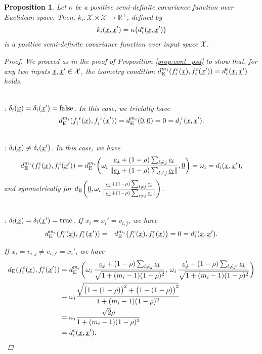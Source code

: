 \documentclass{article}
\newcommand{\vect}[1]{\underline{\smash{#1}}}
\renewcommand{\v}[1]{\vect{#1}}
\newcommand{\reals}{\mathds{R}}
\newcommand{\sX}{\mathcal{X}}
\newcommand{\br}{^{\text{\textnormal{ r}}}}
\newcommand{\cat}{^{\text{\textnormal{c}}}}
\newtheorem{prop}[thm]{Proposition}
\begin{document}
\begin{prop}
Let $\kappa$ be a positive semi-definite covariance function over Euclidean space.
Then, $k_i\colon \sX \times \sX\to \reals^+$, defined by 
\[k_i(\v{x},\v{x}') = \kappa\bigl( d\cat_i(\v{x}, \v{x}') \bigr)\]
is a positive semi-definite covariance function over input space $\sX$. 
\label{prop:cat_psd}
\begin{proof}
We proceed as in the proof of Proposition \ref{prop:cont_psd} to show that, for any two inputs $\v{x},\v{x}' \in \sX$, the isometry condition $d_{\text{E}}^{m_i}(f\cat_i(\v{x}),f\cat_i(\v{x}')) = d\cat_i(\v{x},\v{x}')$ holds.

~\\: $\delta_i(\v{x}) = \delta_i(\v{x}') = \textrm{false}$.
In this case, we trivially have 
\[d_{\text{E}}^{m_i}(f_i\br(\v{x}),f_i\br(\v{x}')) = d_{\text{E}}^{m_i}(\v{0}, \v{0}) = 0 = d_i\br(\v{x},\v{x}').\]

~\\: $\delta_i(\v{x}) \neq \delta_i(\v{x}')$. In this case, we have
\[d_{\text{E}}^{m_i}(f\cat_i(\v{x}),f\cat_i(\v{x}')) = 
d_{\text{E}}^{m_i}\biggl(\omega_i\,\frac{\v{e_j}+(1-\rho)\sum_{l\neq j} \v{e_l}}
{\|\v{e_j}+(1-\rho)\sum_{l\neq j} \v{e_l}\|}, \v{0}\biggr) 
= \omega_i = d_i(\v{x},\v{x}'),\]
and symmetrically for $d_{\text{E}}\biggl(\v{0}, \omega_i\,\frac{\v{e_j}+(1-\rho)\sum_{l\neq j} \v{e_l}}
{\|\v{e_j}+(1-\rho)\sum_{l\neq j} \v{e_l}\|}\biggr)$.

~\\: $\delta_i(\v{x}) = \delta_i(\v{x}') = \textrm{true}$. 
If $x_i=x_i'=v_{i,j}$, we have 
\begin{eqnarray}
\nonumber{}d_{\text{E}}^{m_i}(f\cat_i(\v{x}),f\cat_i(\v{x}')) & = & d_{\text{E}}^{m_i}\bigl(
f\cat_i(\v{x}),f\cat_i(\v{x})
\bigr) = 0 = d\cat_i(\v{x}, \v{x}').
\end{eqnarray}

\noindent{}If $x_i=v_{i,j} \neq v_{i,j'} = x_i'$, we have 
\begin{align} 
\nonumber{}d_{\text{E}}(f\cat_i(\v{x}),f\cat_i(\v{x}')) & = 
d_{\text{E}}^{m_i}\biggl(
\omega_i\,\frac{\v{e_j}+(1-\rho)\sum_{l\neq j} \v{e_l}}
{\sqrt{1+(m_i-1)(1-\rho)^2}},\,
\omega_i\,\frac{\v{e_j'}+(1-\rho)\sum_{l\neq j'} \v{e_l}}
{\sqrt{1+(m_i-1)(1-\rho)^2}}
\biggr) \\
& = \omega_i \frac{\sqrt{\bigl(1-(1-\rho)\bigr)^2 + \bigl(1-(1-\rho)\bigr)^2}}
{1+(m_i-1)(1-\rho)^2} \nonumber\\
& = \omega_i \frac{\sqrt{2} \rho}
{1+(m_i-1)(1-\rho)^2} \nonumber\\
& = d\cat_i(\v{x}, \v{x}').
\end{align}
\end{proof}
\end{prop}
\end{document}
